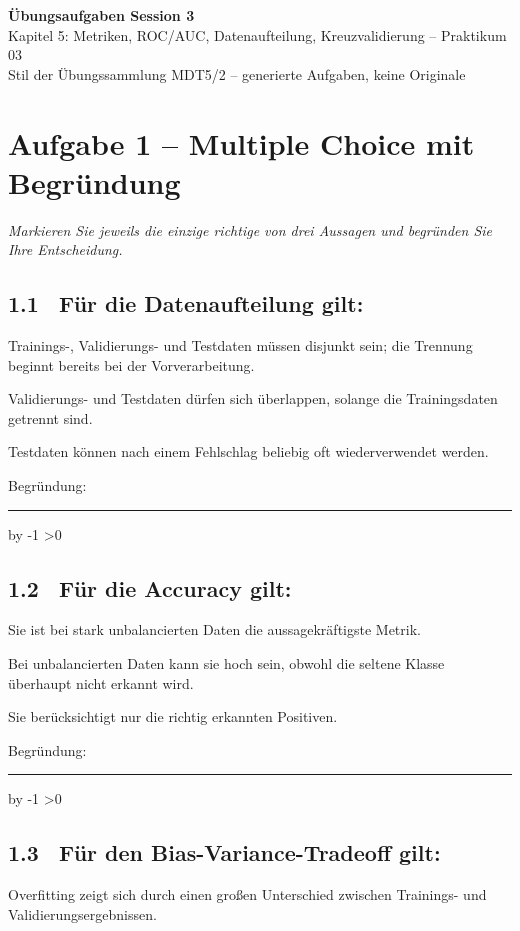 \documentclass[10pt,a4paper]{article}
\newcommand{\mcbox}{\raisebox{-1pt}{\fbox{\rule{0pt}{7pt}\rule{7pt}{0pt}}}\hspace{6pt}}
\newcommand{\antwortlinien}[1]{%
  \par\vspace{2pt}%
  \newcount\zeilen \zeilen=#1
  \loop
    \noindent\rule{\linewidth}{0.4pt}\par\vspace{11pt}%
    \advance\zeilen by -1
  \ifnum\zeilen>0 \repeat
}
\begin{document}
\begin{center}
  {\Large\bfseries Übungsaufgaben Session 3}\\[4pt]
  {\large Kapitel 5: Metriken, ROC/AUC, Datenaufteilung, Kreuzvalidierung -- Praktikum 03}\\[4pt]
  \small Stil der Übungssammlung MDT5/2 -- generierte Aufgaben, keine Originale
\end{center}

\vspace{4pt}

\section*{Aufgabe 1 -- Multiple Choice mit Begründung}
\emph{Markieren Sie jeweils die einzige richtige von drei Aussagen und begründen Sie Ihre Entscheidung.}

\subsection*{1.1 \ Für die Datenaufteilung gilt:}
\mcbox Trainings-, Validierungs- und Testdaten müssen disjunkt sein; die Trennung beginnt
bereits bei der Vorverarbeitung.

\mcbox Validierungs- und Testdaten dürfen sich überlappen, solange die Trainingsdaten getrennt sind.

\mcbox Testdaten können nach einem Fehlschlag beliebig oft wiederverwendet werden.

Begründung:
\antwortlinien{2}

\subsection*{1.2 \ Für die Accuracy gilt:}
\mcbox Sie ist bei stark unbalancierten Daten die aussagekräftigste Metrik.

\mcbox Bei unbalancierten Daten kann sie hoch sein, obwohl die seltene Klasse überhaupt
nicht erkannt wird.

\mcbox Sie berücksichtigt nur die richtig erkannten Positiven.

Begründung:
\antwortlinien{2}

\subsection*{1.3 \ Für den Bias-Variance-Tradeoff gilt:}
\mcbox Overfitting zeigt sich durch einen großen Unterschied zwischen Trainings- und
Validierungsergebnissen.
\end{document}
